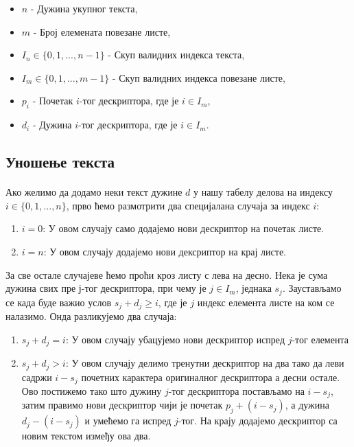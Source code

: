 \documentclass[12pt,oneside]{memoir}
\begin{document}
\begin{itemize}
	\item \(n\) - Дужина укупног текста,
	\item \(m\) - Број елемената повезане листе,
	\item \(I_n \in \{0, 1,...,n-1\}\) - Скуп валидних индекса текста,
	\item \(I_m \in \{0, 1,...,m-1\}\) - Скуп валидних индекса повезане листе,
	\item \(p_i\) - Почетак \(i\)-тог дескриптора, где је \(i \in I_m\),
	\item \(d_i\) - Дужина \(i\)-тог дескриптора, где је \(i \in I_m\).
\end{itemize}

\subsection{Уношење текста}
\paragraph{}
Ако желимо да додамо неки текст дужине \(d\) у нашу табелу делова на индексу 
\(i \in \{0,1,...,n\}\), прво ћемо размотрити два специјалана случаја за индекс \(i\):

\begin{enumerate}
	\item \(i=0\): У овом случају само додајемо нови дескриптор на почетак листе.
	\item \(i=n\): У овом случају додајемо нови дексриптор на крај листе.
\end{enumerate}

За све остале случајеве ћемо проћи кроз листу с лева на десно. Нека је сума дужина свих
пре \(ј\)-тог дескриптора, при чему је \(j \in I_m\), једнака \(s_j\). Заустављамо се 
када буде важио услов \(s_j + d_j \geq i\), где је \(j\) индекс елемента листе на ком
се налазимо. Онда разликујемо два случаја:

\begin{enumerate}
	\item \(s_j + d_j = i\): У овом случају убацујемо нови дескриптор испред \(j\)-тог
	елемента
	\item \(s_j + d_j > i\): У овом случају делимо тренутни дескриптор на два тако
	да леви садржи \(i - s_j\) почетних карактера оригиналног дескриптора а десни остале.
	Ово постижемо тако што дужину \(j\)-тог дескриптора постављамо на \(i - s_j\), затим
	правимо нови дескриптор чији је почетак \(p_j + (i - s_j)\), а дужина \(d_j - (i - s_j)\)
	и умећемо га испред \(j\)-тог. На крају додајемо дескриптор са новим текстом између ова
	два.
	
\end{enumerate}
\end{document}
